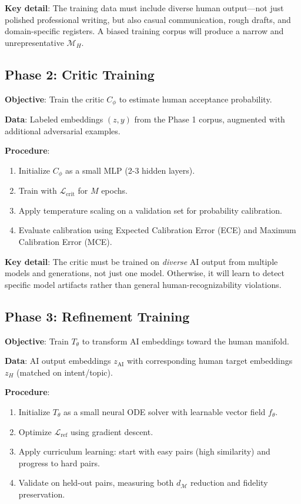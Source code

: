 \documentclass[12pt,oneside]{article}
\begin{document}
\textbf{Key detail}: The training data must include diverse human output---not just polished professional writing, but also casual communication, rough drafts, and domain-specific registers. A biased training corpus will produce a narrow and unrepresentative $\mathcal{M}_H$.

\subsection{Phase 2: Critic Training}

\textbf{Objective}: Train the critic $C_\phi$ to estimate human acceptance probability.

\textbf{Data}: Labeled embeddings $(z, y)$ from the Phase 1 corpus, augmented with additional adversarial examples.

\textbf{Procedure}:
\begin{enumerate}[noitemsep]
    \item Initialize $C_\phi$ as a small MLP (2-3 hidden layers).
    \item Train with $\mathcal{L}_\text{crit}$ for $M$ epochs.
    \item Apply temperature scaling on a validation set for probability calibration.
    \item Evaluate calibration using Expected Calibration Error (ECE) and Maximum Calibration Error (MCE).
\end{enumerate}

\textbf{Key detail}: The critic must be trained on \textit{diverse} AI output from multiple models and generations, not just one model. Otherwise, it will learn to detect specific model artifacts rather than general human-recognizability violations.

\subsection{Phase 3: Refinement Training}

\textbf{Objective}: Train $T_\theta$ to transform AI embeddings toward the human manifold.

\textbf{Data}: AI output embeddings $z_\text{AI}$ with corresponding human target embeddings $z_H$ (matched on intent/topic).

\textbf{Procedure}:
\begin{enumerate}[noitemsep]
    \item Initialize $T_\theta$ as a small neural ODE solver with learnable vector field $f_\theta$.
    \item Optimize $\mathcal{L}_\text{ref}$ using gradient descent.
    \item Apply curriculum learning: start with easy pairs (high similarity) and progress to hard pairs.
    \item Validate on held-out pairs, measuring both $d_\mathcal{M}$ reduction and fidelity preservation.
\end{enumerate}
\end{document}
